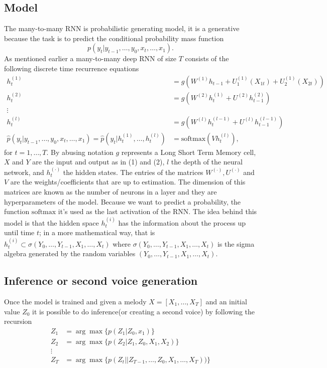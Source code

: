 \documentclass{article}
\begin{document}
\subsection*{Model}
The many-to-many RNN is probabilistic generating model, it is a generative because the task is to predict the conditional probability mass function
\begin{equation}
p(y_t|y_{t-1},\dots,y_0,x_t,\dots,x_1).
\end{equation}
As mentioned earlier a many-to-many deep RNN of size $T$ consists of the following discrete time recurrence equations
\begin{equation}
	\begin{split}
		h^{(1)}_t &= g\left(W^{(1)}h_{t-1}+U^{(1)}_1(X_{1t})+U^{(1)}_2(X_{2t})\right)\\
		h^{(2)}_t &= g\left(W^{(2)}h^{(1)}_{t}+U^{(2)}h^{(2)}_{t-1}\right)\\
		\vdots\\
		h^{(l)}_t &= g\left(W^{(l)}h^{(l-1)}_{t}+U^{(l)}h^{(l-1)}_{t-1}\right) \\
		\hat{p}(y_t|y_{t-1},\dots,y_0,x_t,\dots,x_1)=\hat{p}(y_t|h^{(1)}_t,\dots,h^{(l)}_t)&= \mbox{softmax}(Vh^{(l)}_t),
	\end{split}
\end{equation}
 for $t=1,\dots,T$. By abusing notation $g$ represents a Long Short Term Memory cell, $X$ and $Y$ are the input and output as in (1) and (2), $l$ the depth of the neural network, and $h^{(\cdot)}_t$ the hidden states. The entries of the matrices $W^{(\cdot)},U^{(\cdot)}$ and $V$ are the weights/coefficients that are up to estimation. The dimension of this matrices are known as the number of neurons in a layer and they are hyperparameters of the model. Because we want to predict a probability, the function $\mbox{softmax}$ it's used as the last activation of the RNN. 
The idea behind this model is that the hidden space $h^{(i)}_t$ has the information about the process up until time $t$; in a more mathematical way, that is $h^{(i)}_t\subset \sigma (Y_0,\dots,Y_{t-1},X_1,\dots,X_t)$ where $ \sigma (Y_0,\dots,Y_{t-1},X_1,\dots,X_t)$ is the sigma algebra generated by the random variables $(Y_0,\dots,Y_{t-1},X_1,\dots,X_t)$\cite{Calin}.
\subsection*{Inference or second voice generation}
Once the model is trained and given a melody $X=[X_1,\dots,X_T]$ and an initial value $Z_0$ it is possible to do inference(or creating a second voice) by following the recursion
\begin{equation}
	\begin{split}
		Z_1 &= \arg\max \{p(Z_1|Z_0,x_1)\}\\
		Z_2 &= \arg\max \{p(Z_2|Z_1,Z_0,X_1,X_2)\}\\
		\vdots&\\
		Z_T &=  \arg\max \{p(Z_t||Z_{T-1},\dots,Z_{0},X_1,\dots,X_T))\}
	\end{split}
\end{equation}
\end{document}
